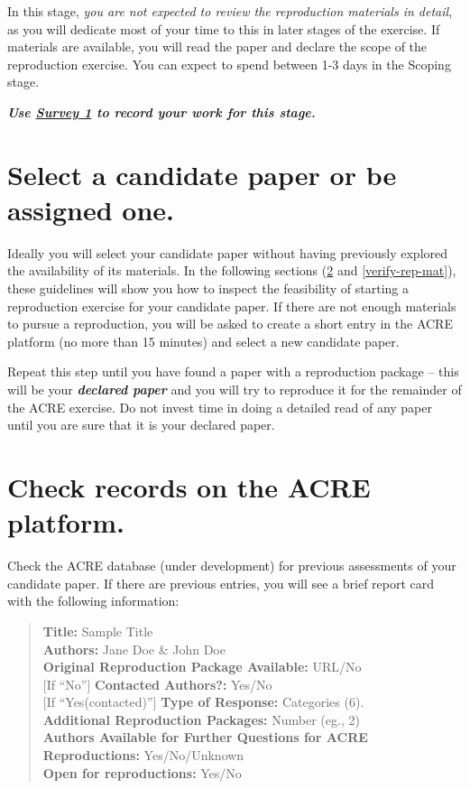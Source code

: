 \documentclass[]{book}
\begin{document}
In this stage, \emph{you are not expected to review the reproduction materials in detail}, as you will dedicate most of your time to this in later stages of the exercise. If materials are available, you will read the paper and declare the scope of the reproduction exercise. You can expect to spend between 1-3 days in the Scoping stage.

\textbf{\emph{Use \href{https://berkeley.qualtrics.com/jfe/form/SV_2bO83uJvU9ZiTXv}{Survey 1} to record your work for this stage.}}

\hypertarget{select-a-candidate-paper-or-be-assigned-one.}{%
\section{Select a candidate paper or be assigned one.}\label{select-a-candidate-paper-or-be-assigned-one.}}

Ideally you will select your candidate paper without having previously explored the availability of its materials. In the following sections (\ref{check-acre} and \ref{verify-rep-mat}), these guidelines will show you how to inspect the feasibility of starting a reproduction exercise for your candidate paper. If there are not enough materials to pursue a reproduction, you will be asked to create a short entry in the ACRE platform (no more than 15 minutes) and select a new candidate paper.

Repeat this step until you have found a paper with a reproduction package -- this will be your \textbf{\emph{declared paper}} and you will try to reproduce it for the remainder of the ACRE exercise. Do not invest time in doing a detailed read of any paper until you are sure that it is your declared paper.

\hypertarget{check-acre}{%
\section{Check records on the ACRE platform.}\label{check-acre}}

Check the ACRE database (under development) for previous assessments of your candidate paper. If there are previous entries, you will see a brief report card with the following information:

\begin{quote}
\textbf{Title:} Sample Title\\
\textbf{Authors:} Jane Doe \& John Doe\\
\textbf{Original Reproduction Package Available:} URL/No\\
{[}If ``No''{]} \textbf{Contacted Authors?:} Yes/No\\
{[}If ``Yes(contacted)''{]} \textbf{Type of Response:} Categories (6).\\
\textbf{Additional Reproduction Packages:} Number (eg., 2)\\
\textbf{Authors Available for Further Questions for ACRE Reproductions:} Yes/No/Unknown\\
\textbf{Open for reproductions:} Yes/No
\end{quote}
\end{document}
